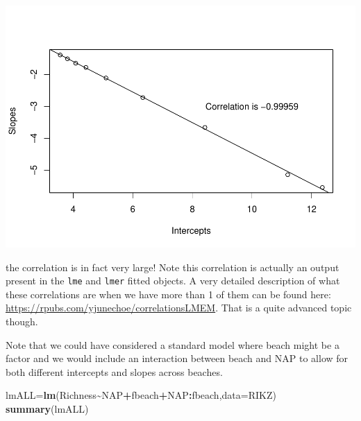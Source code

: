 \documentclass[
]{book}
\newenvironment{Shaded}{\begin{snugshade}}{\end{snugshade}}
\newcommand{\AttributeTok}[1]{\textcolor[rgb]{0.13,0.29,0.53}{#1}}
\newcommand{\FunctionTok}[1]{\textcolor[rgb]{0.13,0.29,0.53}{\textbf{#1}}}
\newcommand{\NormalTok}[1]{#1}
\newcommand{\OtherTok}[1]{\textcolor[rgb]{0.56,0.35,0.01}{#1}}
\newcommand{\SpecialCharTok}[1]{\textcolor[rgb]{0.81,0.36,0.00}{\textbf{#1}}}
\begin{document}
\includegraphics{ECOMODbook_files/figure-latex/unnamed-chunk-80-1.pdf}

the correlation is in fact very large! Note this correlation is actually an output present in the \texttt{lme} and \texttt{lmer} fitted objects. A very detailed description of what these correlations are when we have more than 1 of them can be found here: \url{https://rpubs.com/yjunechoe/correlationsLMEM}. That is a quite advanced topic though.

Note that we could have considered a standard model where beach might be a factor and we would include an interaction between beach and NAP to allow for both different intercepts and slopes across beaches.

\begin{Shaded}
\begin{Highlighting}[]
\NormalTok{lmALL}\OtherTok{=}\FunctionTok{lm}\NormalTok{(Richness}\SpecialCharTok{\textasciitilde{}}\NormalTok{NAP}\SpecialCharTok{+}\NormalTok{fbeach}\SpecialCharTok{+}\NormalTok{NAP}\SpecialCharTok{:}\NormalTok{fbeach,}\AttributeTok{data=}\NormalTok{RIKZ)}
\FunctionTok{summary}\NormalTok{(lmALL)}
\end{Highlighting}
\end{Shaded}
\end{document}
